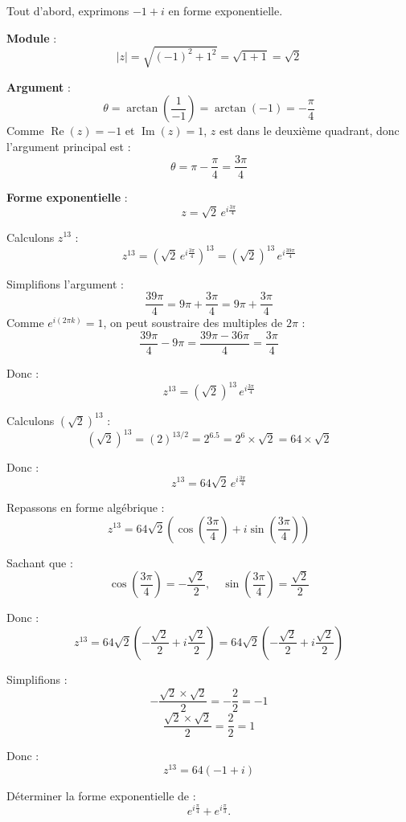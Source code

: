 \documentclass[a4paper,12pt]{article}
\begin{document}
\begin{solutionbox}
Tout d'abord, exprimons \( -1 + i \) en forme exponentielle.

\textbf{Module} :
\[
|z| = \sqrt{(-1)^2 + 1^2} = \sqrt{1 + 1} = \sqrt{2}
\]

\textbf{Argument} :
\[
\theta = \arctan\left( \dfrac{1}{-1} \right) = \arctan(-1) = -\dfrac{\pi}{4}
\]
Comme \( \operatorname{Re}(z) = -1 \) et \( \operatorname{Im}(z) = 1 \), \( z \) est dans le deuxième quadrant, donc l'argument principal est :
\[
\theta = \pi - \dfrac{\pi}{4} = \dfrac{3\pi}{4}
\]

\textbf{Forme exponentielle} :
\[
z = \sqrt{2}\, e^{i\frac{3\pi}{4}}
\]

Calculons \( z^{13} \) :
\[
z^{13} = \left( \sqrt{2}\, e^{i\frac{3\pi}{4}} \right)^{13} = (\sqrt{2})^{13} \, e^{i\frac{39\pi}{4}}
\]

Simplifions l'argument :
\[
\frac{39\pi}{4} = 9\pi + \dfrac{3\pi}{4} = 9\pi + \dfrac{3\pi}{4}
\]
Comme \( e^{i(2\pi k)} = 1 \), on peut soustraire des multiples de \( 2\pi \) :
\[
\frac{39\pi}{4} - 9\pi = \dfrac{39\pi - 36\pi}{4} = \dfrac{3\pi}{4}
\]

Donc :
\[
z^{13} = (\sqrt{2})^{13} \, e^{i\frac{3\pi}{4}}
\]

Calculons \( (\sqrt{2})^{13} \) :
\[
(\sqrt{2})^{13} = (2)^{13/2} = 2^{6.5} = 2^{6} \times \sqrt{2} = 64 \times \sqrt{2}
\]

Donc :
\[
z^{13} = 64 \sqrt{2} \, e^{i\frac{3\pi}{4}}
\]

Repassons en forme algébrique :
\[
z^{13} = 64 \sqrt{2} \left( \cos\left( \dfrac{3\pi}{4} \right) + i\sin\left( \dfrac{3\pi}{4} \right) \right)
\]

Sachant que :
\[
\cos\left( \dfrac{3\pi}{4} \right) = -\dfrac{\sqrt{2}}{2}, \quad \sin\left( \dfrac{3\pi}{4} \right) = \dfrac{\sqrt{2}}{2}
\]

Donc :
\[
z^{13} = 64 \sqrt{2} \left( -\dfrac{\sqrt{2}}{2} + i\dfrac{\sqrt{2}}{2} \right) = 64 \sqrt{2} \left( -\dfrac{\sqrt{2}}{2} + i\dfrac{\sqrt{2}}{2} \right)
\]

Simplifions :
\[
-\dfrac{\sqrt{2} \times \sqrt{2}}{2} = -\dfrac{2}{2} = -1
\]
\[
\dfrac{\sqrt{2} \times \sqrt{2}}{2} = \dfrac{2}{2} = 1
\]

Donc :
\[
z^{13} = 64 (-1 + i)
\]
\end{solutionbox}

\begin{tcolorbox}[title=Exercice 4 - {[}Calculer{]}]
Déterminer la forme exponentielle de :
\[
e^{i\frac{\pi}{4}} + e^{i\frac{\pi}{3}}.
\]
\end{tcolorbox}
\end{document}
